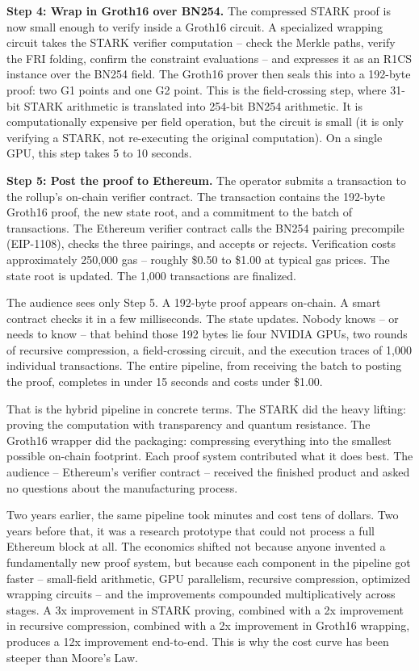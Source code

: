 \documentclass[
  11pt,
  openany]{report}
\renewcommand{\textbf}[1]{{\bfseries\color{MidnightBold}#1}}
\begin{document}
\textbf{Step 4: Wrap in Groth16 over BN254.} The compressed STARK proof is now
small enough to verify inside a Groth16 circuit. A specialized wrapping circuit
takes the STARK verifier computation -- check the Merkle paths, verify the FRI
folding, confirm the constraint evaluations -- and expresses it as an R1CS
instance over the BN254 field. The Groth16 prover then seals this into a
192-byte proof: two G1 points and one G2 point. This is the field-crossing step,
where 31-bit STARK arithmetic is translated into 254-bit BN254 arithmetic. It is
computationally expensive per field operation, but the circuit is small (it is
only verifying a STARK, not re-executing the original computation). On a single
GPU, this step takes 5 to 10 seconds.

\textbf{Step 5: Post the proof to Ethereum.} The operator submits a transaction
to the rollup's on-chain verifier contract. The transaction contains the
192-byte Groth16 proof, the new state root, and a commitment to the batch of
transactions. The Ethereum verifier contract calls the BN254 pairing precompile
(EIP-1108), checks the three pairings, and accepts or rejects. Verification
costs approximately 250,000 gas -- roughly \$0.50 to \$1.00 at typical gas
prices. The state root is updated. The 1,000 transactions are finalized.

The audience sees only Step 5. A 192-byte proof appears on-chain. A smart
contract checks it in a few milliseconds. The state updates. Nobody knows -- or
needs to know -- that behind those 192 bytes lie four NVIDIA GPUs, two rounds of
recursive compression, a field-crossing circuit, and the execution traces of
1,000 individual transactions. The entire pipeline, from receiving the batch to
posting the proof, completes in under 15 seconds and costs under \$1.00.

That is the hybrid pipeline in concrete terms. The STARK did the heavy lifting:
proving the computation with transparency and quantum resistance. The Groth16
wrapper did the packaging: compressing everything into the smallest possible
on-chain footprint. Each proof system contributed what it does best. The
audience -- Ethereum's verifier contract -- received the finished product and
asked no questions about the manufacturing process.

Two years earlier, the same pipeline took minutes and cost tens of dollars. Two
years before that, it was a research prototype that could not process a full
Ethereum block at all. The economics shifted not because anyone invented a
fundamentally new proof system, but because each component in the pipeline got
faster -- small-field arithmetic, GPU parallelism, recursive compression,
optimized wrapping circuits -- and the improvements compounded multiplicatively
across stages. A 3x improvement in STARK proving, combined with a 2x improvement
in recursive compression, combined with a 2x improvement in Groth16 wrapping,
produces a 12x improvement end-to-end. This is why the cost curve has been
steeper than Moore's Law.
\end{document}
